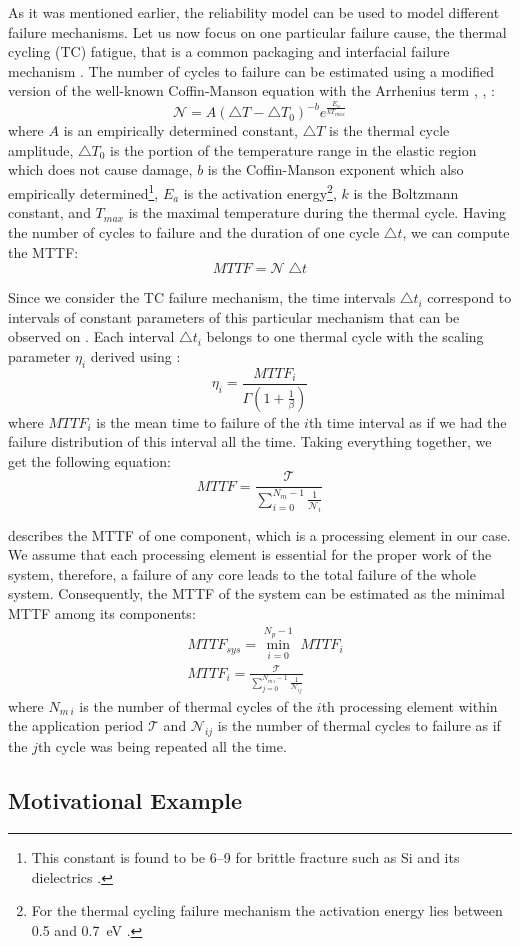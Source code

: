 As it was mentioned earlier, the reliability model can be used to model different failure mechanisms. Let us now focus on one particular failure cause, the thermal cycling (TC) fatigue, that is a common packaging and interfacial failure mechanism \cite{jedec2010}. The number of cycles to failure can be estimated using a modified version of the well-known Coffin-Manson equation with the Arrhenius term \cite{jedec2010}, \cite{xiang2010}, \cite{ciappa2003}:
\begin{equation} \label{eq:cycles-to-failure}
  \mathcal{N} = A (\triangle T - \triangle T_0)^{-b} e^{\frac{E_a}{k T_{max}}}
\end{equation}
where $A$ is an empirically determined constant, $\triangle T$ is the thermal cycle amplitude, $\triangle T_0$ is the portion of the temperature range in the elastic region which does not cause damage, $b$ is the Coffin-Manson exponent which also empirically determined\footnote{This constant is found to be 6--9 for brittle fracture such as Si and its dielectrics \cite{jedec2010}.}, $E_{a}$ is the activation energy\footnote{For the thermal cycling failure mechanism the activation energy lies between 0.5 and 0.7~eV \cite{vigrass}.}, $k$ is the Boltzmann constant, and $T_{max}$ is the maximal temperature during the thermal cycle. Having the number of cycles to failure and the duration of one cycle $\triangle t$, we can compute the MTTF:
\[
  MTTF = \mathcal{N} \; \triangle t
\]

Since we consider the TC failure mechanism, the time intervals $\triangle t_i$ correspond to intervals of constant parameters of this particular mechanism that can be observed on . Each interval $\triangle t_i$ belongs to one thermal cycle with the scaling parameter $\eta_i$ derived using :
\[
  \eta_i = \frac{MTTF_i}{\Gamma(1 + \frac{1}{\beta})}
\]
where $MTTF_i$ is the mean time to failure of the $i$th time interval as if we had the failure distribution of this interval all the time. Taking everything together, we get the following equation:
\begin{equation} \label{eq:one-mttf}
  MTTF = \frac{\mathcal{T}}{\sum_{i=0}^{N_m - 1} \frac{1}{\mathcal{N}_i}}
\end{equation}

 describes the MTTF of one component, which is a processing element in our case. We assume that each processing element is essential for the proper work of the system, therefore, a failure of any core leads to the total failure of the whole system. Consequently, the MTTF of the system can be estimated as the minimal MTTF among its components:
\begin{align*}
  & MTTF_{sys} = \min_{i=0}^{N_p - 1} \; MTTF_i \\
  & MTTF_i = \frac{\mathcal{T}}{\sum_{j=0}^{N_{m \: i} - 1} \frac{1}{\mathcal{N}_{ij}}}
\end{align*}
where $N_{m \: i}$ is the number of thermal cycles of the $i$th processing element within the application period $\mathcal{T}$ and $\mathcal{N}_{ij}$ is the number of thermal cycles to failure as if the $j$th cycle was being repeated all the time.

\subsection{Motivational Example} \label{sec:motivation}

